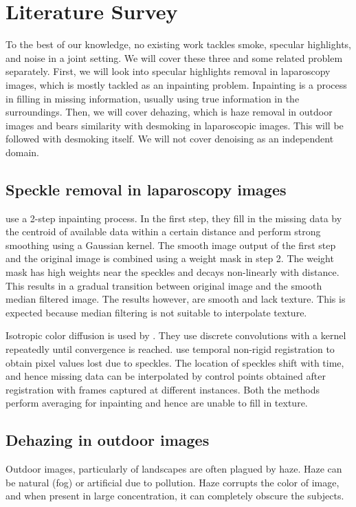 
\chapter{Literature Survey}

To the best of our knowledge, no existing work tackles smoke, specular highlights, and noise in a joint setting. We will cover these three and some related problem separately. First, we will look into specular highlights removal in laparoscopy images, which is mostly tackled as an inpainting problem. Inpainting is a process in filling in missing information, usually using true information in the surroundings. Then, we will cover dehazing, which is haze removal in outdoor images and bears similarity with desmoking in laparoscopic images. This will be followed with desmoking itself. We will not cover denoising as an independent domain.

\section{Speckle removal in laparoscopy images}
\cite{arnold2010speckle} use a 2-step inpainting process. In the first step, they fill in the missing data by the centroid of available data within a certain distance and perform strong smoothing using a Gaussian kernel. The smooth image output of the first step and the original image is combined using a weight mask in step 2. The weight mask has high weights near the speckles and decays non-linearly with distance. This results in a gradual transition between original image and the smooth median filtered image. The results however, are smooth and lack texture. This is expected because median filtering is not suitable to interpolate texture.

Isotropic color diffusion is used by \cite{saint2011detection}. They use discrete convolutions with a kernel repeatedly until convergence is reached. \cite{stoyanov2005removing} use temporal non-rigid registration to obtain pixel values lost due to speckles. The location of speckles shift with time, and hence missing data can be interpolated by control points obtained after registration with frames captured at different instances. Both the methods perform averaging for inpainting and hence are unable to fill in texture.

\section{Dehazing in outdoor images}
Outdoor images, particularly of landscapes are often plagued by haze. Haze can be natural (fog) or artificial due to pollution. Haze corrupts the color of image, and when present in large concentration, it can completely obscure the subjects.

